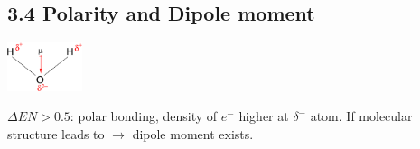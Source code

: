\subsection{3.4 Polarity and Dipole moment} 
\begin{minipage}{20mm}
    \includegraphics[width=2.2cm]{src/3_Chemical_bondings/images/dipole_moment.png}
\end{minipage}
\begin{minipage}{47mm}
    $\Delta EN>0.5$: polar bonding, density of $e^-$ higher at $\delta^-$ atom.
        If molecular structure leads to  $\rightarrow$ dipole moment exists.
\end{minipage}    

